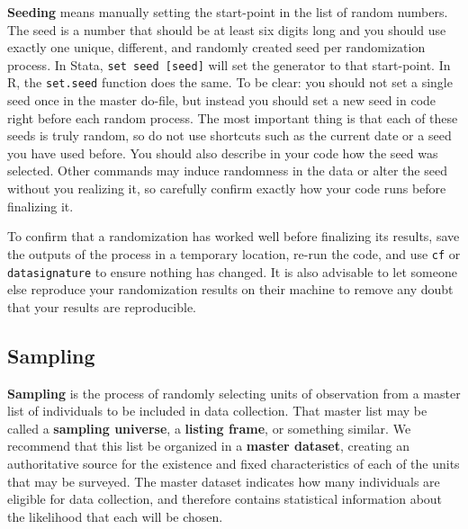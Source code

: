 \textbf{Seeding} means manually setting the start-point in the list of random numbers.
The seed is a number that should be at least six digits long and you should use exactly
one unique, different, and randomly created seed per randomization process.
In Stata, \texttt{set seed [seed]} will set the generator to that start-point. In R, the \texttt{set.seed} function does the same.
To be clear: you should not set a single seed once in the master do-file,
but instead you should set a new seed in code right before each random process.
The most important thing is that each of these seeds is truly random,
so do not use shortcuts such as the current date or a seed you have used before.
You should also describe in your code how the seed was selected.
Other commands may induce randomness in the data or alter the seed without you realizing it,
so carefully confirm exactly how your code runs before finalizing it.

To confirm that a randomization has worked well before finalizing its results,
save the outputs of the process in a temporary location,
re-run the code, and use \texttt{cf} or \texttt{datasignature} to ensure
nothing has changed. It is also advisable to let someone else reproduce your
randomization results on their machine to remove any doubt that your results
are reproducible.




\subsection{Sampling}

\textbf{Sampling} is the process of randomly selecting units of observation
from a master list of individuals to be included in data collection.
That master list may be called a \textbf{sampling universe}, a \textbf{listing frame}, or something similar.
We recommend that this list be organized in a \textbf{master dataset},
creating an authoritative source for the existence and fixed
characteristics of each of the units that may be surveyed.
The master dataset indicates how many individuals are eligible for data collection,
and therefore contains statistical information about the likelihood that each will be chosen.

